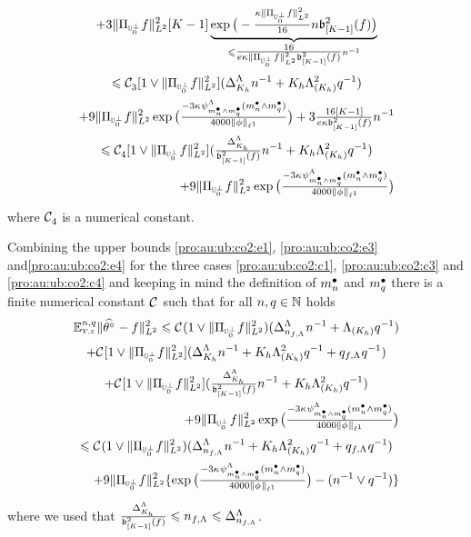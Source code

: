 \begin{pro}
\begin{multline}
+3
\VnormLp{\Proj[{\mHiH[0]^\perp}]\xdf}^2[K-1]\underbrace{\exp\big(-
\tfrac{\rWc\VnormLp{\Proj[{\mHiH[0]^\perp}]\xdf}^2}{16}\ssY\bias[{[K-1]}]^2(\xdf)\big)}_{\leq\tfrac{16}{e\rWc\VnormLp{\Proj[{\mHiH[0]^\perp}]\xdf}^2\bias[{[K-1]}]^2(\xdf)}\ssY^{-1}}
\\
\leq\cst{3}[1\vee\VnormLp{\Proj[{\mHiH[0]^\perp}]\xdf}^2](\DipenSv[K_{\ydf}]\ssY^{-1}+K_{\ydf}\miSv[K_{\ydf}]^2\ssE^{-1})\\
\hfill+9
\VnormLp{\Proj[{\mHiH[0]^\perp}]\xdf}^2\exp\big(\tfrac{-3\cpen\cmiSv[\sDi{\ssY}\wedge\sDi{\ssE}](\sDi{\ssY}\wedge\sDi{\ssE})}{4000\Vnormlp[1]{\fydf}}\big)
+3\tfrac{16[K-1]}{e\rWc\bias[{[K-1]}]^2(\xdf)}\ssY^{-1}\\
\leq\cst{4}[1\vee\VnormLp{\Proj[{\mHiH[0]^\perp}]\xdf}^2](\tfrac{\DipenSv[K_{\ydf}]}{\bias[{[K-1]}]^2(\xdf)}\ssY^{-1}+K_{\ydf}\miSv[K_{\ydf}]^2\ssE^{-1})\\
\hfill+9
\VnormLp{\Proj[{\mHiH[0]^\perp}]\xdf}^2\exp\big(\tfrac{-3\cpen\cmiSv[\sDi{\ssY}\wedge\sDi{\ssE}](\sDi{\ssY}\wedge\sDi{\ssE})}{4000\Vnormlp[1]{\fydf}}\big)
\end{multline}
where $\cst{4}$ is a numerical constant.


Combining
the upper bounds \eqref{pro:au:ub:co2:e1}, \eqref{pro:au:ub:co2:e3} and\eqref{pro:au:ub:co2:e4}
for the three cases  \ref{pro:au:ub:co2:c1}, \ref{pro:au:ub:co2:c3} and
\ref{pro:au:ub:co2:c4} and keeping in mind the definition of
$\sDi{\ssY}$ and $\sDi{\ssE}$ there is a finite numerical constant
$\cst{}$ such that for all $\ssY,\ssE\in\Nz$ holds
\begin{multline}\label{pro:au:ub:co2:e5}
\FuEx[\ssY,\ssE]{\rY,\rE}\VnormLp{\hxdfPr[]-\xdf}^2
\leq
\cst{}(1\vee\VnormLp{\Proj[{\mHiH[0]^\perp}]\xdf}^2)(\DipenSv[\ssY_{\xdf,\iSv}]\ssY^{-1}+\miSv[K_{\ydf}]\ssE^{-1})\\
+\cst{}[1\vee\VnormLp{\Proj[{\mHiH[0]^\perp}]\xdf}^2](\DipenSv[K_{\ydf}]\ssY^{-1}+K_{\ydf}\miSv[K_{\ydf}]^2\ssE^{-1}+\ssE_{\xdf,\iSv}\ssE^{-1})\\
+\cst{}[1\vee\VnormLp{\Proj[{\mHiH[0]^\perp}]\xdf}^2](\tfrac{\DipenSv[K_{\ydf}]}{\bias[{[K-1]}]^2(\xdf)}\ssY^{-1}+K_{\ydf}\miSv[K_{\ydf}]^2\ssE^{-1})\\
\hfill+9
\VnormLp{\Proj[{\mHiH[0]^\perp}]\xdf}^2\exp\big(\tfrac{-3\cpen\cmiSv[\sDi{\ssY}\wedge\sDi{\ssE}](\sDi{\ssY}\wedge\sDi{\ssE})}{4000\Vnormlp[1]{\fydf}}\big)\\
\leq
\cst{}(1\vee\VnormLp{\Proj[{\mHiH[0]^\perp}]\xdf}^2)(\DipenSv[\ssY_{\xdf,\iSv}]\ssY^{-1}+K_{\ydf}\miSv[K_{\ydf}]^2\ssE^{-1}+\ssE_{\xdf,\iSv}\ssE^{-1})\\
\hfill+9
\VnormLp{\Proj[{\mHiH[0]^\perp}]\xdf}^2\{\exp\big(\tfrac{-3\cpen\cmiSv[\sDi{\ssY}\wedge\sDi{\ssE}](\sDi{\ssY}\wedge\sDi{\ssE})}{4000\Vnormlp[1]{\fydf}}\big)-(\ssY^{-1}\vee\ssE^{-1})\}
\end{multline}
where we used that $\tfrac{\DipenSv[K_{\ydf}]}{\bias[{[K-1]}]^2(\xdf)}\leq
\ssY_{\xdf,\iSv}\leq \DipenSv[\ssY_{\xdf,\iSv}]$.


\end{pro}
